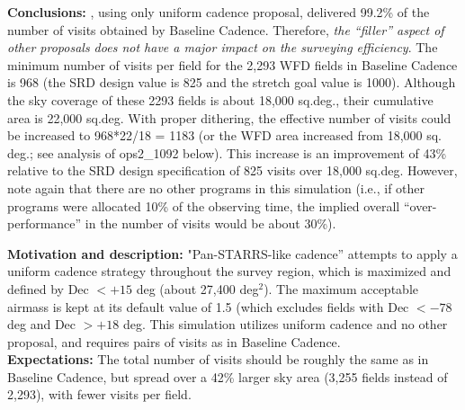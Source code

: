 {\bf Conclusions:} , using only uniform cadence
proposal, delivered 99.2\% of the number of visits obtained by
Baseline Cadence. Therefore, {\it the ``filler'' aspect of other
proposals does not have a major impact on the surveying efficiency}.
The minimum number of visits per field for the 2,293 WFD fields in
Baseline Cadence is 968 (the SRD design value is 825 and the stretch
goal value is 1000). Although the sky coverage of these 2293 fields is
about 18,000 sq.deg., their cumulative area is 22,000 sq.deg. With
proper dithering, the effective number of visits could be increased to
968*22/18 = 1183 (or the WFD area increased from 18,000 sq. deg.; see
analysis of ops2\_1092 below). This increase is an improvement of 43\%
relative to the SRD design specification of 825 visits over 18,000
sq.deg. However, note again that there are no other programs in this
simulation (i.e., if other programs were allocated 10\% of the
observing time, the implied overall ``over-performance'' in the number
of  visits would be about 30\%).



{\bf Motivation and description:} "Pan-STARRS-like cadence” attempts
to apply a uniform cadence strategy throughout the survey region,
which is maximized and defined by Dec $< +15$ deg (about 27,400
deg$^2$). The maximum acceptable airmass is kept at its default value
of 1.5 (which excludes fields with Dec $< -78$ deg and Dec $> +18$
deg. This simulation utilizes uniform cadence and no other proposal,
and requires pairs of visits as in Baseline Cadence. \\

{\bf Expectations:} The total number of visits should be roughly the
same as in Baseline Cadence, but spread over a 42\% larger sky area
(3,255 fields instead of 2,293), with fewer visits per field. \\

